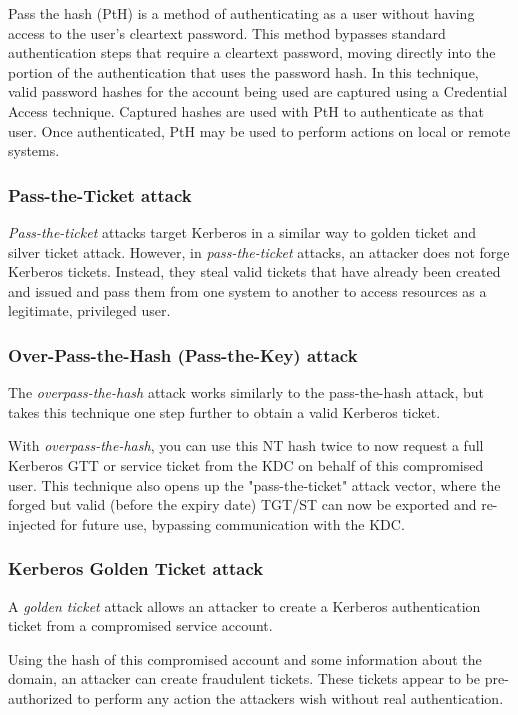 Pass the hash (PtH) is a method of authenticating as a user without having access to the user's cleartext password. This method bypasses standard authentication steps that require a cleartext password, moving directly into the portion of the authentication that uses the password hash. In this technique, valid password hashes for the account being used are captured using a Credential Access technique. Captured hashes are used with PtH to authenticate as that user. Once authenticated, PtH may be used to perform actions on local or remote systems.

\subsubsection{Pass-the-Ticket attack}
\textit{Pass-the-ticket} attacks target Kerberos in a similar way to golden ticket and silver ticket attack. However, in \textit{pass-the-ticket} attacks, an attacker does not forge Kerberos tickets. Instead, they steal valid tickets that have already been created and issued and pass them from one system to another to access resources as a legitimate, privileged user.

\subsubsection{Over-Pass-the-Hash (Pass-the-Key) attack}
The \textit{overpass-the-hash} attack works similarly to the pass-the-hash attack, but takes this technique one step further to obtain a valid Kerberos ticket.

With \textit{overpass-the-hash}, you can use this NT hash twice to now request a full Kerberos GTT or service ticket from the KDC on behalf of this compromised user. This technique also opens up the "pass-the-ticket" attack vector, where the forged but valid (before the expiry date) TGT/ST can now be exported and re-injected for future use, bypassing communication with the KDC.

\newpage

\subsubsection{Kerberos Golden Ticket attack}
A \textit{golden ticket} attack allows an attacker to create a Kerberos authentication ticket from a compromised service account.

Using the hash of this compromised account and some information about the domain, an attacker can create fraudulent tickets. These tickets appear to be pre-authorized to perform any action the attackers wish without real authentication.

